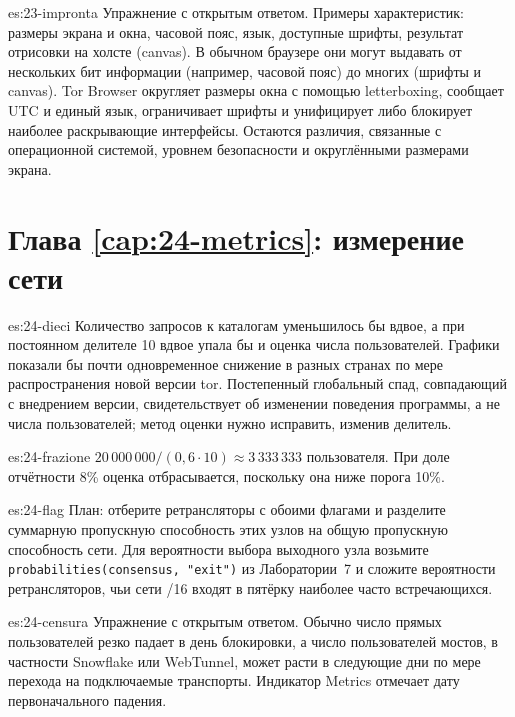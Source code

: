 \begin{soluzione}{es:23-impronta}
Упражнение с открытым ответом. Примеры характеристик: размеры экрана и окна, часовой пояс, язык, доступные шрифты, результат отрисовки на холсте (canvas). В обычном браузере они могут выдавать от нескольких бит информации (например, часовой пояс) до многих (шрифты и canvas). Tor Browser округляет размеры окна с помощью letterboxing, сообщает UTC и единый язык, ограничивает шрифты и унифицирует либо блокирует наиболее раскрывающие интерфейсы. Остаются различия, связанные с операционной системой, уровнем безопасности и округлёнными размерами экрана.
\end{soluzione}

\section*{Глава \ref{cap:24-metrics}: измерение сети}

\begin{soluzione}{es:24-dieci}
Количество запросов к каталогам уменьшилось бы вдвое, а при постоянном делителе 10 вдвое упала бы и оценка числа пользователей. Графики показали бы почти одновременное снижение в разных странах по мере распространения новой версии tor. Постепенный глобальный спад, совпадающий с внедрением версии, свидетельствует об изменении поведения программы, а не числа пользователей; метод оценки нужно исправить, изменив делитель.
\end{soluzione}

\begin{soluzione}{es:24-frazione}
$20\,000\,000 / (0{,}6 \cdot 10) \approx 3\,333\,333$ пользователя. При доле отчётности 8\% оценка отбрасывается, поскольку она ниже порога 10\%.
\end{soluzione}

\begin{soluzione}{es:24-flag}
План: отберите ретрансляторы с обоими флагами и разделите суммарную пропускную способность этих узлов на общую пропускную способность сети. Для вероятности выбора выходного узла возьмите \texttt{probabilities(consensus, "exit")} из Лаборатории~7 и сложите вероятности ретрансляторов, чьи сети /16 входят в пятёрку наиболее часто встречающихся.
\end{soluzione}

\begin{soluzione}{es:24-censura}
Упражнение с открытым ответом. Обычно число прямых пользователей резко падает в день блокировки, а число пользователей мостов, в частности Snowflake или WebTunnel, может расти в следующие дни по мере перехода на подключаемые транспорты. Индикатор Metrics отмечает дату первоначального падения.
\end{soluzione}

